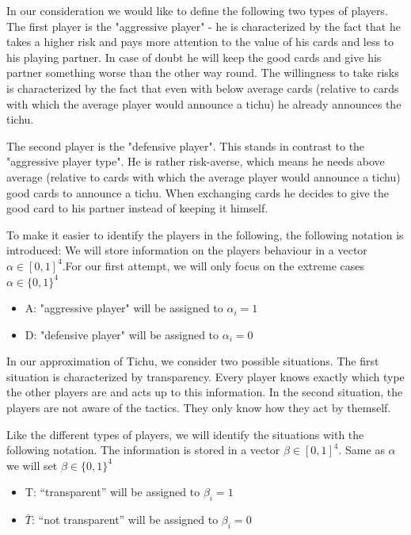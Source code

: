 In our consideration we would like to define the following two types of players.
The first player is the "aggressive player" - he is characterized by the fact that he takes a higher risk and pays more attention to the value of his cards and less to his playing partner. In case of doubt he will keep the good cards and give his partner something worse than the other way round.
The willingness to take risks is characterized by the fact that even with below average cards (relative to cards with which the average player would announce a tichu) he already announces the tichu. 

The second player is the "defensive player". This stands in contrast to the "aggressive player type". He is rather risk-averse, which means he needs above average (relative to cards with which the average player would announce a tichu) good cards to announce a tichu.
When exchanging cards he decides to give the good card to his partner instead of keeping it himself.

To make it easier to identify the players in the following, the following notation is introduced:
We will store information on the players behaviour in a vector $\alpha \in [0,1]^4$.For our first attempt, we will only focus on the extreme cases $\alpha \in \{0,1\}^4$
\\ 
\begin{itemize}
\item A: "aggressive player" will be assigned to $\alpha_i = 1$
\item D: "defensive player" will be assigned to $\alpha_i = 0$ \\
\end{itemize} 
In our approximation of Tichu, we consider two possible situations. 
The first situation is characterized by transparency. Every player knows exactly which type the other players are and acts up to this information.
In the second situation, the players are not aware of the tactics. They only know how they act by themself.

Like the different types of players, we will identify the situations with the following notation. The information is stored in a vector $\beta \in [0,1]^4$. Same as $\alpha$ we will set $\beta \in \{0,1\}^4$\\ 
\begin{itemize}
\item T: “transparent” will be assigned to $\beta_i = 1$
\item $\overline{T}$: “not transparent” will be assigned to $\beta_i = 0$ \\
\end{itemize}

